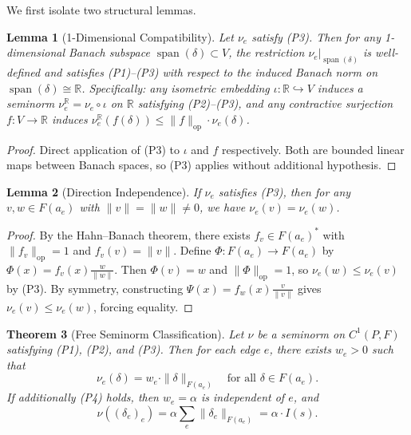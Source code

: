 \documentclass[11pt,a4paper]{amsart}
\theoremstyle{plain}
\newtheorem{theorem}{Theorem}[section]
\newtheorem{lemma}[theorem]{Lemma}
\theoremstyle{definition}
\DeclareMathOperator{\opnorm}{op}
\DeclareMathOperator{\spn}{span}
\begin{document}
We first isolate two structural lemmas.

\begin{lemma}[1-Dimensional Compatibility]\label{lem:1d}
Let $\nu_e$ satisfy \textup{(P3)}. Then for any 1-dimensional Banach subspace $\spn(\delta) \subset V$, the restriction $\nu_e|_{\spn(\delta)}$ is well-defined and satisfies \textup{(P1)--(P3)} with respect to the induced Banach norm on $\spn(\delta) \cong \mathbb{R}$. Specifically: any isometric embedding $\iota: \mathbb{R} \hookrightarrow V$ induces a seminorm $\nu_e^{\mathbb{R}} = \nu_e \circ \iota$ on $\mathbb{R}$ satisfying \textup{(P2)--(P3)}, and any contractive surjection $f: V \to \mathbb{R}$ induces $\nu_e^{\mathbb{R}}(f(\delta)) \leq \|f\|_{\opnorm} \cdot \nu_e(\delta)$.
\end{lemma}

\begin{proof}
Direct application of (P3) to $\iota$ and $f$ respectively. Both are bounded linear maps between Banach spaces, so (P3) applies without additional hypothesis.
\end{proof}

\begin{lemma}[Direction Independence]\label{lem:direction}
If $\nu_e$ satisfies \textup{(P3)}, then for any $v, w \in F(a_e)$ with $\|v\| = \|w\| \neq 0$, we have $\nu_e(v) = \nu_e(w)$.
\end{lemma}

\begin{proof}
By the Hahn--Banach theorem, there exists $f_v \in F(a_e)^*$ with $\|f_v\|_{\opnorm} = 1$ and $f_v(v) = \|v\|$. Define $\Phi: F(a_e) \to F(a_e)$ by $\Phi(x) = f_v(x) \frac{w}{\|w\|}$. Then $\Phi(v) = w$ and $\|\Phi\|_{\opnorm} = 1$, so $\nu_e(w) \leq \nu_e(v)$ by (P3). By symmetry, constructing $\Psi(x) = f_w(x) \frac{v}{\|v\|}$ gives $\nu_e(v) \leq \nu_e(w)$, forcing equality.
\end{proof}

\begin{theorem}[Free Seminorm Classification]\label{thm:main}
Let $\nu$ be a seminorm on $C^1(P, F)$ satisfying \textup{(P1)}, \textup{(P2)}, and \textup{(P3)}. Then for each edge $e$, there exists $w_e > 0$ such that
\[
\nu_e(\delta) = w_e \cdot \|\delta\|_{F(a_e)} \quad \text{for all } \delta \in F(a_e).
\]
If additionally \textup{(P4)} holds, then $w_e = \alpha$ is independent of $e$, and
\[
\nu((\delta_e)_e) = \alpha \sum_{e} \|\delta_e\|_{F(a_e)} = \alpha \cdot I(s).
\]
\end{theorem}
\end{document}
